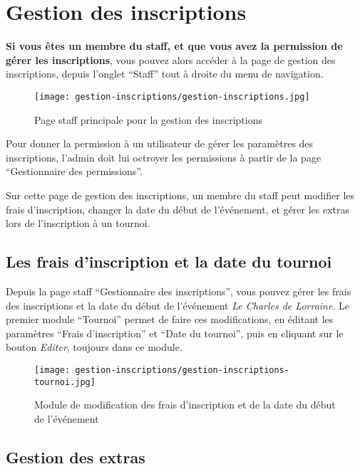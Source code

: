 \section{Gestion des inscriptions}

\textbf{Si vous êtes un membre du staff, et que vous avez la permission de gérer les inscriptions}, vous pouvez alors accéder à la page de gestion des inscriptions, depuis l'onglet \enquote{Staff} tout à droite du menu de navigation.

\begin{figure}[H]
\centering
\texttt{[image: gestion-inscriptions/gestion-inscriptions.jpg]}
\caption{Page staff principale pour la gestion des inscriptions}
\end{figure}

Pour donner la permission à un utilisateur de gérer les paramètres des inscriptions, l'admin doit lui octroyer les permissions à partir de la page \enquote{Gestionnaire des permissions}.

\bigskip

Sur cette page de gestion des inscriptions, un membre du staff peut modifier les frais d'inscription, changer la date du début de l'événement, et gérer les extras lors de l'inscription à un tournoi.

\subsection{Les frais d'inscription et la date du tournoi}

Depuis la page staff \enquote{Gestionnaire des inscriptions}, vous pouvez gérer les frais des inscriptions et la date du début de l'événement \textit{Le Charles de Lorraine}. Le premier module \enquote{Tournoi} permet de faire ces modifications, en éditant les paramètres \enquote{Frais d'inscription} et \enquote{Date du tournoi}, puis en cliquant sur le bouton \textit{Editer}, toujours dans ce module.

\begin{figure}[H]
\centering
\texttt{[image: gestion-inscriptions/gestion-inscriptions-tournoi.jpg]}
\caption{Module de modification des frais d'inscription et de la date du début de l'événement}
\end{figure}

\subsection{Gestion des extras}

